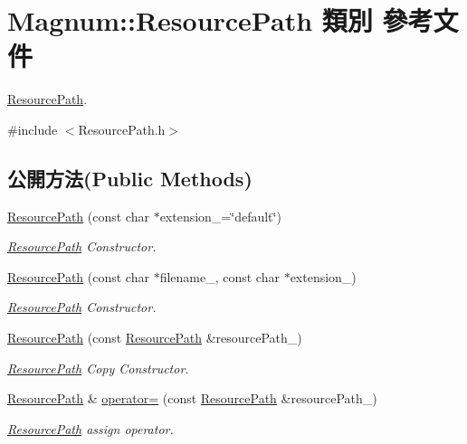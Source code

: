 \hypertarget{class_magnum_1_1_resource_path}{}\section{Magnum\+:\+:Resource\+Path 類別 參考文件}
\label{class_magnum_1_1_resource_path}


\hyperlink{class_magnum_1_1_resource_path}{Resource\+Path}.  




{\ttfamily \#include $<$Resource\+Path.\+h$>$}

\subsection*{公開方法(Public Methods)}
\begin{DoxyCompactItemize}
\item 
\hyperlink{class_magnum_1_1_resource_path_afe366e99a3174e71001030b184d1cdb9}{Resource\+Path} (const char $\ast$extension\+\_\+=\char`\"{}default\char`\"{})
\begin{DoxyCompactList}\small\item\em \hyperlink{class_magnum_1_1_resource_path}{Resource\+Path} Constructor. \end{DoxyCompactList}\item 
\hyperlink{class_magnum_1_1_resource_path_a23b8bc053eb524173a418d3e99aae6c8}{Resource\+Path} (const char $\ast$filename\+\_\+, const char $\ast$extension\+\_\+)
\begin{DoxyCompactList}\small\item\em \hyperlink{class_magnum_1_1_resource_path}{Resource\+Path} Constructor. \end{DoxyCompactList}\item 
\hyperlink{class_magnum_1_1_resource_path_a20d3c0ee3b90dd65ee89bec71783128f}{Resource\+Path} (const \hyperlink{class_magnum_1_1_resource_path}{Resource\+Path} \&resource\+Path\+\_\+)
\begin{DoxyCompactList}\small\item\em \hyperlink{class_magnum_1_1_resource_path}{Resource\+Path} Copy Constructor. \end{DoxyCompactList}\item 
\hyperlink{class_magnum_1_1_resource_path}{Resource\+Path} \& \hyperlink{class_magnum_1_1_resource_path_a6293f188262d023721ea37badc4f8b97}{operator=} (const \hyperlink{class_magnum_1_1_resource_path}{Resource\+Path} \&resource\+Path\+\_\+)
\begin{DoxyCompactList}\small\item\em \hyperlink{class_magnum_1_1_resource_path}{Resource\+Path} assign operator. \end{DoxyCompactList}\item 

\end{DoxyCompactItemize}
